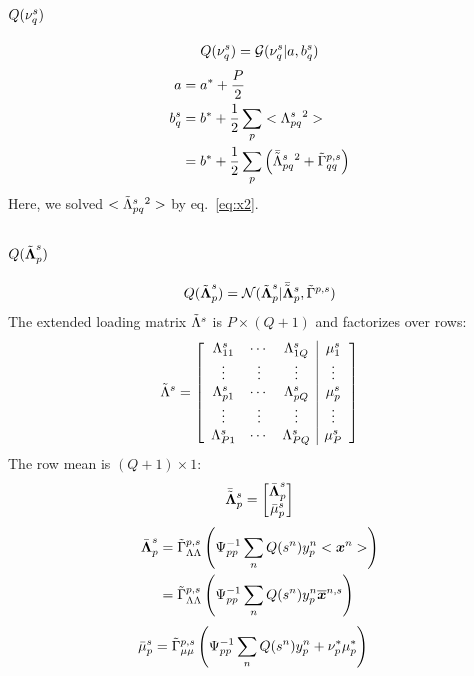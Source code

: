 \documentclass[a4paper]{article}
\begin{document}
\subsection{$Q(\nu^s_q)$}
\begin{align}
 Q(\nu^s_q)=\mathcal{G}(\nu^s_q|a, b_q^s)
\end{align}
\begin{align}
a&=a^*+\frac{P}{2} \\
b_q^s&=b^*+\frac{1}{2}\sum_p<\Lambda^s_{pq}{}^2> \\
&=b^*+\frac{1}{2}\sum_p\left(\bar{\tilde{\Lambda}}^s_{pq}{}^2 + \tilde{\Gamma}^{p,s}_{qq}\right)
\end{align}
Here, we solved $<\tilde{\Lambda}^s_{pq}{}^2>$ by eq.~\ref{eq:x2}.

\subsection{$Q(\tilde{\boldsymbol{\Lambda}}^s_p)$}
\begin{align}
  Q(\tilde{\boldsymbol{\Lambda}}^s_p)=\mathcal{N}(\tilde{\boldsymbol{\Lambda}}^s_p|\bar{\tilde{\boldsymbol{\Lambda}}}^s_p,\tilde{\Gamma}^{p,s})
\end{align}
The extended loading matrix $\tilde{\Lambda}^s$ is $P\times (Q+1)$ and factorizes over rows:
\begin{align}
  \tilde{\Lambda}^s=\left[
    \begin{array}{ccc|c}
      \Lambda^s_{11} & \cdots & \Lambda^s_{1Q} & \mu^s_1 \\
      \vdots & \vdots & \vdots & \vdots \\
      \Lambda^s_{p1} & \cdots & \Lambda^s_{pQ} & \mu^s_p \\
      \vdots & \vdots & \vdots & \vdots \\
      \Lambda^s_{P1} & \cdots & \Lambda^s_{PQ} & \mu^s_P
    \end{array}
  \right]
\end{align}
The row mean is $(Q+1)\times 1$:
\begin{align}
  \bar{\tilde{\boldsymbol{\Lambda}}}^s_p=\begin{bmatrix}
    \bar{\boldsymbol{\Lambda}}^s_p \\
    \bar{\mu}^s_p
  \end{bmatrix}
\end{align}
\begin{align}
  \bar{\boldsymbol{\Lambda}}^s_p
  &=\tilde{\Gamma}^{p,s}_{\Lambda\Lambda}\left(\Psi^{-1}_{pp}\sum_n Q(s^n)y^n_p<\boldsymbol{x}^n>\right) \\
  &=\tilde{\Gamma}^{p,s}_{\Lambda\Lambda}\left(\Psi^{-1}_{pp}\sum_n Q(s^n)y^n_p\overline{\boldsymbol{x}}^{n,s}\right)
\end{align}
\begin{align}
  \bar{\mu}^s_p
  &=\tilde{\Gamma}^{p,s}_{\mu\mu}\left(\Psi^{-1}_{pp}\sum_n Q(s^n)y^n_p+\nu^*_p\mu^*_p\right)
\end{align}
\end{document}
